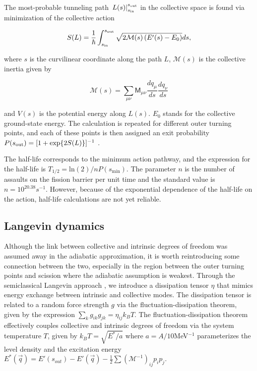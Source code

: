 The most-probable tunneling path $\left. L(s) \right|_{s_{\rm in}}^{s_{\rm out}}$ in the collective space is found via minimization of the collective action

\begin{equation}\label{eq:action} 
S(L) = \frac{1}{\hbar}\int_{s_{\rm in}}^{s_{\rm out}} \sqrt{2\mathcal{M}(s)\left(E'(s)-E_0\right)}ds,
\end{equation} 

\noindent where $s$ is the curvilinear coordinate along the path $L$, $\mathcal{M}(s)$ is the collective inertia given by \cite{Sadhukhan2013}

\begin{equation}
\mathcal{M}(s) = \sum_{\mu\nu} \mathsf{M}_{\mu\nu} \frac{dq_\mu}{ds} \frac{dq_\nu}{ds}
\end{equation}

\noindent and $V(s)$ is the potential energy along $L(s)$. $E_0$ stands for the collective ground-state energy. The calculation is repeated for different outer turning points, and each of these points is then assigned an exit probability $P(s_{\rm out})=[1+\exp{2S(L)}]^{-1}$ \cite{Baran1978}. 

The half-life corresponds to the minimum action pathway, and the expression for the half-life is $T_{1/2} = \mathrm{ln}(2)/nP(s_\mathrm{min})$. The parameter $n$ is the number of assaults on the fission barrier per unit time and the standard value is $n=10^{20.38} s^{-1}$. However, because of the exponential dependence of the half-life on the action, half-life calculations are not yet reliable.

\subsection{Langevin dynamics}

Although the link between collective and intrinsic degrees of freedom was assumed away in the adiabatic approximation, it is worth reintroducing some connection between the two, especially in the region between the outer turning points and scission where the adiabatic assumption is weakest. Through the semiclassical Langevin approach \cite{Abe1996,Frobrich1998,Sadhukhan2016}, we introduce a dissipation tensor $\eta$ that mimics energy exchange between intrinsic and collective modes. The dissipation tensor is related to a random force strength $g$ via the fluctuation-dissipation theorem, given by the expression $\sum_k g_{ik}g_{jk} = \eta_{ij}k_BT$. The fluctuation-dissipation theorem effectively couples collective and intrinsic degrees of freedom via the system temperature $T$, given by $k_BT = \sqrt{E^*/a}$ where $a=A/10$MeV$^{-1}$ parameterizes the level density and the excitation energy $E^*(\vec{q}) = E'(s_{out}) - E'(\vec{q}) - \frac{1}{2}\sum\left(\mathcal{M}^{-1}\right)_{ij}p_i p_j$.

